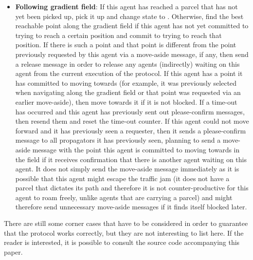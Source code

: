\begin{itemize}
    \item \textbf{Following gradient field}: If this agent has reached a parcel that has not yet been picked up, pick it up and change state to . Otherwise, find the best reachable point along the gradient field if this agent has not yet committed to trying to reach a certain position and commit to trying to reach that position. If there is such a point and that point is different from the point previously requested by this agent via a move-aside message, if any, then send a release message in order to release any agents (indirectly) waiting on this agent from the current execution of the protocol. If this agent has a point it has committed to moving towards (for example, it was previously selected when navigating along the gradient field or that point was requested via an earlier move-aside), then move towards it if it is not blocked. If a time-out has occurred and this agent has previously sent out please-confirm messages, then resend them and reset the time-out counter. If this agent could not move forward and it has previously seen a requester, then it sends a please-confirm message to all propagators it has previously seen, planning to send a move-aside message with the point this agent is committed to moving towards in the  field if it receives confirmation that there is another agent waiting on this agent. It does not simply send the move-aside message immediately as it is possible that this agent might escape the traffic jam (it does not have a parcel that dictates its path and therefore it is not counter-productive for this agent to roam freely, unlike agents that are carrying a parcel) and might therefore send unnecessary move-aside messages if it finds itself blocked later.
\end{itemize}

There are still some corner cases that have to be considered in order to guarantee that the protocol works correctly, but they are not interesting to list here. If the reader is interested, it is possible to consult the source code accompanying this paper.

